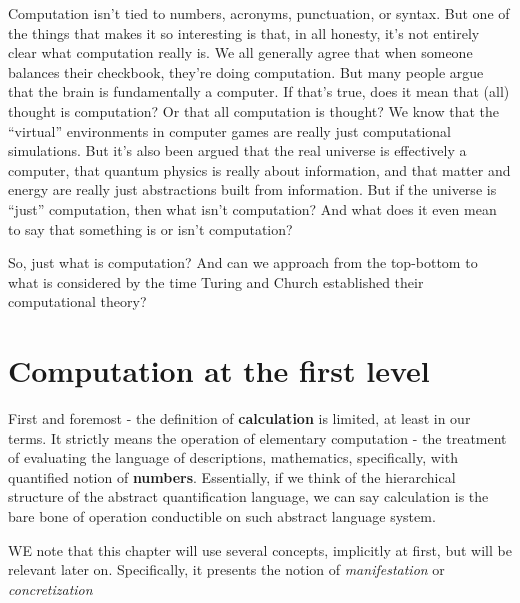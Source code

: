 \begin{displayquote}
    Computation isn't tied to numbers, acronyms, punctuation, or syntax.  But one of the things that makes it so interesting is that, in all honesty, it's not entirely clear what computation really is.   We all generally agree that when someone balances their checkbook, they're doing computation.  But many people argue that the brain is fundamentally a computer.  If that's true, does it mean that (all) thought is computation?  Or that all computation is thought?  We know that the “virtual” environments in computer games are really just computational simulations.   But it's also been argued that the real universe is effectively a computer, that quantum physics is really about information, and that matter and energy are really just abstractions built from information.  But if the universe is “just” computation, then what isn't computation?  And what does it even mean to say that something is or isn't computation?
\end{displayquote}

So, just what is computation? And can we approach from the top-bottom to what is considered by the time Turing and Church established their computational theory?

\section{Computation at the first level}
First and foremost - the definition of \textbf{calculation} is limited, at least in our terms. It strictly means the operation of elementary computation - the treatment of evaluating the language of descriptions, mathematics, specifically, with quantified notion of \textbf{numbers}. Essentially, if we think of the hierarchical structure of the abstract quantification language, we can say calculation is the bare bone of operation conductible on such abstract language system. 

WE note that this chapter will use several concepts, implicitly at first, but will be relevant later on. Specifically, it presents the notion of \textit{manifestation} or \textit{concretization}

